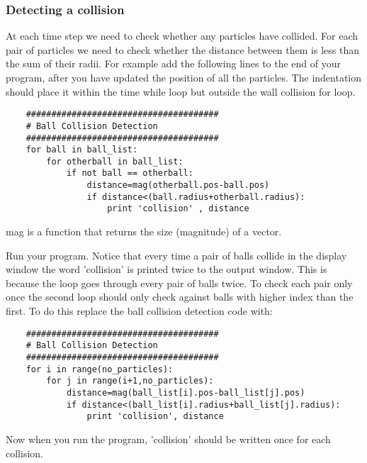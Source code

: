 \documentclass[12pt]{article}
\begin{document}
\subsubsection{Detecting a collision}
At each time step we need to check whether any particles have collided.
For each pair of particles we need to check whether the distance between
them is less than the sum of their radii.
For example add the following lines to the end of your program,
after you have updated the position of all the particles.
The indentation should place it within the time {\color{code}while} loop but outside the wall collision {\color{code}for} loop.
{\color{code}\begin{verbatim}
    ######################################
    # Ball Collision Detection
    ######################################
    for ball in ball_list:
        for otherball in ball_list:
            if not ball == otherball:
                distance=mag(otherball.pos-ball.pos)
                if distance<(ball.radius+otherball.radius):
                    print 'collision' , distance
\end{verbatim}}
{\color{code}mag} is a function that returns the size (magnitude) of a vector.

Run your program.
Notice that every time a pair of balls collide in the display window the word 'collision'
is printed twice to the output window.
This is because the loop goes through every pair of balls twice.
To check each pair only once the second loop should only check against balls with
higher index than the first. To do this replace the ball collision detection code with:
{\color{code}\begin{verbatim}
    ######################################
    # Ball Collision Detection
    ######################################
    for i in range(no_particles):
        for j in range(i+1,no_particles):
            distance=mag(ball_list[i].pos-ball_list[j].pos)
            if distance<(ball_list[i].radius+ball_list[j].radius):
                print 'collision', distance
\end{verbatim}}
Now when you run the program, 'collision' should be written once for each collision.
\end{document}
